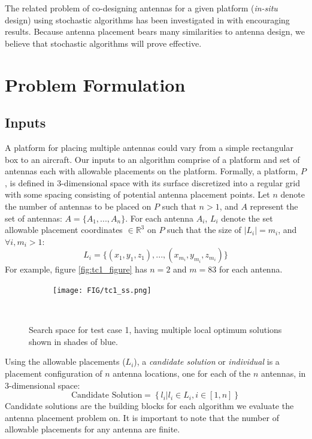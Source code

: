 \documentclass[conference]{IEEEtran}
\begin{document}
The related problem of co-designing antennas for a given platform ({\em in-situ} design) using stochastic algorithms has been investigated in \cite{linden2000wire} with encouraging results. Because antenna placement bears many similarities to antenna design, we believe that stochastic algorithms will prove effective.

\section{Problem Formulation}
\label{sec:problem}
\subsection{Inputs}
\label{sec:inputs}
A platform for placing multiple antennas could vary from a simple rectangular box to an aircraft. Our inputs to an algorithm comprise of a platform and set of antennas each with allowable placements on the platform. Formally, a platform, $P$, is defined in 3-dimensional space with its surface discretized into a regular grid with some spacing consisting of potential antenna placement points. Let $n$ denote the number of antennas to be placed on $P$ such that $n>1$, and $A$ represent the set of antennas: $A = \{A_1, ..., A_n\}$. For each antenna $A_i$, $L_i$ denote the set allowable placement coordinates $\in \mathbb R^3$ on $P$ such that the size of $\mid L_i \mid =m_i$, and $ \forall i, m_i>1$:
\[
L_i = \{(x_{1}, y_{1}, z_{1}), ..., (x_{m_i}, y_{m_i}, z_{m_i})\}
\]
For example, figure \ref{fig:tc1_figure} has $n=2$ and $m=83$ for each antenna.
\begin{figure}%
    \begin{subfigure}{\columnwidth}
        \texttt{[image: FIG/tc1\_ss.png]}%
    \end{subfigure}\hfill\\
    \caption{Search space for test case 1, having multiple local optimum solutions shown in shades of blue.}%
    \label{fig:tc1_ss}%
\end{figure}

Using the allowable placements ($L_i$), a \textit{candidate solution} or \textit{individual} is a placement configuration of $n$ antenna locations, one for each of the $n$ antennas, in 3-dimensional space:
\[
    \text{Candidate Solution}  = \left\{l_i | l_i \in L_i, i \in [1,n]\right\}
\]
Candidate solutions are the building blocks for each algorithm we evaluate the antenna placement problem on. It is important to note that the number of allowable placements for any antenna are finite. 
\end{document}
